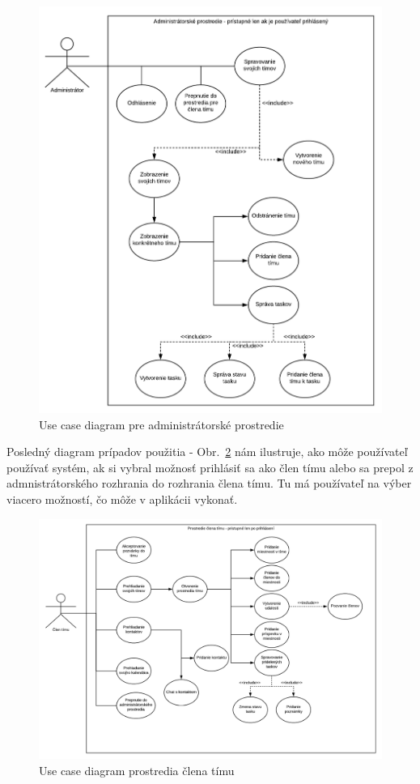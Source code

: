 \begin{figure}[H]
    \centering
    \includegraphics[scale=0.45]{img/DP_use_case_administrator.png}
    \caption{Use case diagram pre administrátorské prostredie}
    \label{fig:use_case_administrator}
\end{figure}

\indent Posledný diagram prípadov použitia - Obr.~\ref{fig:use_case_clen_timu} nám ilustruje, ako môže používateľ používať systém, ak si vybral možnosť prihlásiť sa ako člen tímu alebo sa prepol z admnistrátorského rozhrania do rozhrania člena tímu. Tu má používateľ na výber viacero možností, čo môže v aplikácii vykonať.

\begin{figure}[H]
    \centering
    \includegraphics[scale=0.20]{img/DP_use_case_clen_timu.png}
    \caption{Use case diagram prostredia člena tímu}
    \label{fig:use_case_clen_timu}
\end{figure}

